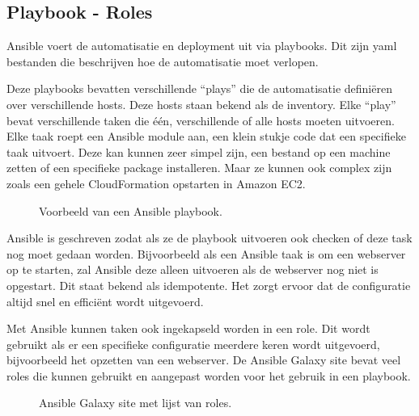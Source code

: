\subsection{Playbook - Roles}
Ansible voert de automatisatie en deployment uit via playbooks. Dit zijn yaml bestanden die beschrijven hoe de automatisatie moet verlopen. 

Deze playbooks bevatten verschillende ``plays'' die de automatisatie definiëren over verschillende hosts. Deze hosts staan bekend als de inventory. Elke ``play'' bevat verschillende taken die één, verschillende of alle hosts moeten uitvoeren. Elke taak roept een Ansible module aan, een klein stukje code dat een specifieke taak uitvoert. Deze kan kunnen zeer simpel zijn, een bestand op een machine zetten of een specifieke package installeren. Maar ze kunnen ook complex zijn zoals een gehele CloudFormation opstarten in Amazon EC2.
\begin{figure}[!htb]
	\caption{Voorbeeld van een Ansible playbook.}
	\label{fig:playbook}
\end{figure}

Ansible is geschreven zodat als ze de playbook uitvoeren ook checken of deze task nog moet gedaan worden. Bijvoorbeeld als een Ansible taak is om een webserver op te starten, zal Ansible deze alleen uitvoeren als de webserver nog niet is opgestart. Dit staat bekend als idempotente. Het zorgt ervoor dat de configuratie altijd snel en efficiënt wordt uitgevoerd.

Met Ansible kunnen taken ook ingekapseld worden in een role. Dit wordt gebruikt als er een specifieke configuratie meerdere keren wordt uitgevoerd, bijvoorbeeld het opzetten van een webserver. De Ansible Galaxy site bevat veel roles die kunnen gebruikt en aangepast worden voor het gebruik in een playbook.
\begin{figure}[!htb]
	\caption{Ansible Galaxy site met lijst van roles.}
	\label{fig:agalaxy}
\end{figure}


